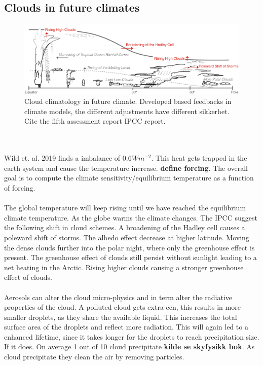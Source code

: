 \subsection{Clouds in future climates}
\begin{figure}
    \centering
    \includegraphics[scale = 0.9]{Fig7-11_ipcc.jpg}
    \caption{Cloud climatology in future climate. Developed based feedbacks in climate models, the different adjustments have different sikkerhet. Cite the fifth assessment report IPCC report.}
    \label{fig:cloud_scheme}
\end{figure}
\\ \\
Wild et. al. 2019 finds a imbalance of $0.6W m^{-2}$. This heat gets trapped in the earth system and cause the temperature increase. \textbf{define forcing}. The overall goal is to compute the climate sensitivity/equilibrium temperature as a function of forcing. 
\\ \\ 
The global temperature will keep rising until we have reached the equilibrium climate temperature. As the globe warms the climate changes. The IPCC suggest the following shift in cloud schemes. A broadening of the Hadley cell causes a poleward shift of storms. The albedo effect decrease at higher latitude. Moving the dense clouds further into the polar night, where only the greenhouse effect is present. The greenhouse effect of clouds still persist without sunlight leading to a net heating in the Arctic. Rising higher clouds causing a stronger greenhouse effect of clouds.
\\ \\
Aerosols can alter the cloud micro-physics and in term alter the radiative properties of the cloud. A polluted cloud gets extra \acrshort{ccn}, this results in more smaller droplets, as they share the available liquid. This increases the total surface area of the droplets and reflect more radiation. This will again led to a enhanced lifetime, since it takes longer for the droplets to reach precipitation size. If it does. On average 1 out of 10 cloud precipitate \textbf{kilde se skyfysikk bok}. As cloud precipitate they clean the air by removing particles.
